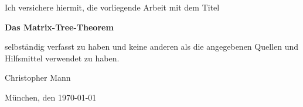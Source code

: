 \documentclass[11pt,a4paper,twoside]{article}
\begin{document}
Ich versichere hiermit, die vorliegende Arbeit mit dem Titel

\begin{center}
	\textbf{Das Matrix-Tree-Theorem}
\end{center}

selbständig verfasst zu haben und keine anderen als die angegebenen Quellen und Hilfsmittel verwendet zu haben.

\vspace*{3cm}

Christopher Mann

\vspace*{1cm}
München, den \myformat\today
\end{document}
